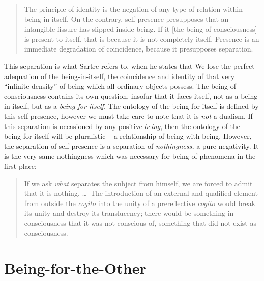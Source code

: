\blockcquote[127]{Sartre}{%
    The principle of identity is the negation of any type of relation within being-in-itself. On the contrary, self-presence presupposes that an intangible fissure has slipped inside being. If it [the being-of-consciousness] is present to itself, that is because it is not completely itself. Presence is an immediate degradation of coincidence, because it presupposes separation.
}

This separation is what Sartre refers to, when he states that  We lose the perfect adequation of the being-in-itself, the coincidence and identity of that very \enquote{infinite density} of being which all ordinary objects possess. The being-of-consciousness contains its own question, insofar that it faces itself, not as a being-in-itself, but as a \emph{being-for-itself.} The ontology of the being-for-itself is defined by this self-presence, however we must take care to note that it is \emph{not} a dualism. If this separation is occasioned by any positive \emph{being}, then the ontology of the being-for-itself will be pluralistic -- a relationship of being with being. However, the separation of self-presence is a separation of \emph{nothingness,} a pure negativity. It is the very same nothingness which was necessary for being-of-phenomena in the first place:

\blockcquote[127]{Sartre}{%
    If we ask \emph{what} separates the subject from himself, we are forced to admit that it is nothing. \ldots\ The introduction of an external and qualified element from outside the \emph{cogito} into the unity of a prereflective \emph{cogito} would break its unity and destroy its translucency; there would be something in consciousness that it was not conscious of, something that did not exist as consciousness.
}




\section{Being-for-the-Other}

